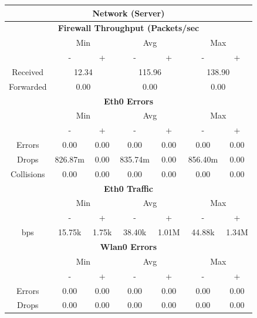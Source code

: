 \documentclass[11pt,a4paper]{scrreprt}
\begin{document}
\begin{table}[H]
\centering
    \begin{tabular}{||c|c|c|c|c|c|c||}
    \hline
    \multicolumn{7}{|c|}{\textbf{Network (Server)}} \\
    \hline
    \multicolumn{7}{|c|}{\textbf{Firewall Throughput (Packets/sec}} \\
    \hline\hline
      & \multicolumn{2}{|c|}{Min} & \multicolumn{2}{|c|}{Avg} & \multicolumn{2}{|c|}{Max} \\
    \hline
      & - & + & - & + & - & + \\
    \hline
    Received & \multicolumn{2}{|c|}{12.34} & \multicolumn{2}{|c|}{115.96} & \multicolumn{2}{|c|}{138.90} \\
    \hline
    Forwarded & \multicolumn{2}{|c|}{0.00} & \multicolumn{2}{|c|}{0.00} & \multicolumn{2}{|c|}{0.00} \\
    \hline\hline
    \multicolumn{7}{|c|}{\textbf{Eth0 Errors}} \\
    \hline\hline
      & \multicolumn{2}{|c|}{Min} & \multicolumn{2}{|c|}{Avg} & \multicolumn{2}{|c|}{Max} \\
    \hline
     & - & + & - & + & - & + \\
    \hline
    Errors & 0.00 & 0.00 & 0.00 & 0.00 & 0.00 & 0.00 \\
    \hline
    Drops & 826.87m & 0.00 & 835.74m & 0.00 & 856.40m & 0.00 \\
    \hline
    Collisions & 0.00 & 0.00 & 0.00 & 0.00 & 0.00 & 0.00 \\
    \hline\hline
    \multicolumn{7}{|c|}{\textbf{Eth0 Traffic}} \\
    \hline\hline
      & \multicolumn{2}{|c|}{Min} & \multicolumn{2}{|c|}{Avg} & \multicolumn{2}{|c|}{Max} \\
    \hline
      & - & + & - & + & - & + \\
    \hline
    bps & 15.75k & 1.75k & 38.40k & 1.01M & 44.88k & 1.34M \\
    \hline\hline
    \multicolumn{7}{|c|}{\textbf{Wlan0 Errors}} \\
    \hline\hline
      & \multicolumn{2}{|c|}{Min} & \multicolumn{2}{|c|}{Avg} & \multicolumn{2}{|c|}{Max} \\
    \hline
      & - & + & - & + & - & + \\
    \hline
    Errors  & 0.00 & 0.00 & 0.00 & 0.00 & 0.00 & 0.00 \\
    \hline
    Drops & 0.00 & 0.00 & 0.00 & 0.00 & 0.00 & 0.00 \\

\end{tabular}
\end{table}
\end{document}

